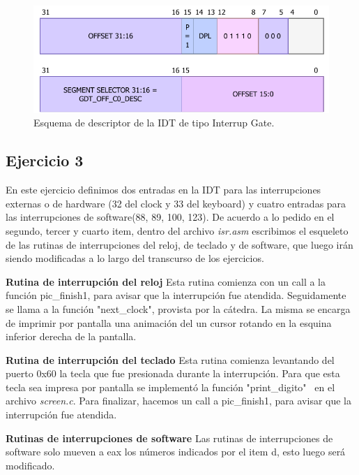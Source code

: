 \documentclass[a4paper]{article}
\begin{document}
\begin{figure}[h]
	\centering
	\includegraphics[scale=0.7]{img/IDTdescriptor.pdf}
	\caption{Esquema de descriptor de la IDT de tipo Interrup Gate.}
\end{figure}


\subsection{Ejercicio 3}
\justify
En este ejercicio definimos dos entradas en la IDT para las interrupciones externas o de hardware (32 del clock y 33 del keyboard) y cuatro entradas para las interrupciones de software(88, 89, 100, 123).
\justify
De acuerdo a lo pedido en el segundo, tercer y cuarto item, dentro del archivo \textit{isr.asm} escribimos el esqueleto de las rutinas de interrupciones del reloj, de teclado y de software, que luego irán siendo modificadas a lo largo del transcurso de los ejercicios.

\justify
\textbf{Rutina de interrupción del reloj}
\justify
Esta rutina comienza con un call a la función pic_finish1, para avisar que la interrupción fue atendida. Seguidamente se llama a la función "next_clock", provista por la cátedra. La misma se encarga de imprimir por pantalla una animación del un cursor rotando en la esquina inferior derecha de la pantalla.

\justify
\textbf{Rutina de interrupción del teclado}
\justify
Esta rutina comienza levantando del puerto 0x60 la tecla que fue presionada durante la interrupción. Para que esta tecla sea impresa por pantalla se implementó la función "print_digito" \ en el archivo \textit{screen.c}. Para finalizar, hacemos un call a pic_finish1, para avisar que la interrupción fue atendida.

\justify
\textbf{Rutinas de interrupciones de software}
\justify
Las rutinas de interrupciones de software solo mueven a eax los números indicados por el item d, esto luego será modificado.
\end{document}
